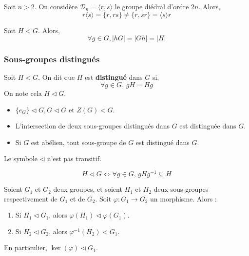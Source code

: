   \begin{example}
    Soit $n > 2$. On considère $\mathcal{D}_n = \langle r, s \rangle$ le groupe diédral d'ordre $2n$. Alors,
    \[ r \langle s \rangle = \{ r, rs \} \neq \{ r, sr \} = \langle s \rangle r \]
  \end{example}

  \begin{proposition}
    Soit $H < G$. Alors,
    \[ \forall g \in G, \vert hG \vert = \vert Gh \vert = \vert H \vert \]
  \end{proposition}

  \subsubsection{Sous-groupes distingués}


  \begin{definition}
    Soit $H < G$. On dit que $H$ est \textbf{distingué} dans $G$ si,
    \[ \forall g \in G, \, gH = Hg \]
    On note cela $H \lhd G$.
  \end{definition}

  \begin{example}
    \begin{itemize}
      \item $\{ e_G \} \lhd G, G \lhd G \text{ et } Z(G) \lhd G$.
      \item L'intersection de deux sous-groupes distingués dans $G$ est distinguée dans $G$.
      \item Si $G$ est abélien, tout sous-groupe de $G$ est distingué dans $G$.
    \end{itemize}
  \end{example}


  \begin{remark}
    Le symbole $\lhd$ n'est pas transitif.
  \end{remark}

  \begin{proposition}
    \[ H \lhd G \iff \forall g \in G, \, gHg^{-1} \subseteq H \]
  \end{proposition}


  \begin{proposition}
    Soient $G_1$ et $G_2$ deux groupes, et soient $H_1$ et $H_2$ deux sous-groupes respectivement de $G_1$ et de $G_2$. Soit $\varphi : G_1 \rightarrow G_2$ un morphisme. Alors :
    \begin{enumerate}[label=(\roman*)]
      \item Si $H_1 \lhd G_1$, alors $\varphi(H_1) \lhd \varphi(G_1)$.
      \item Si $H_2 \lhd G_2$, alors $\varphi^{-1}(H_2) \lhd G_1$.
    \end{enumerate}
    En particulier, $\ker(\varphi) \lhd G_1$.
  \end{proposition}

